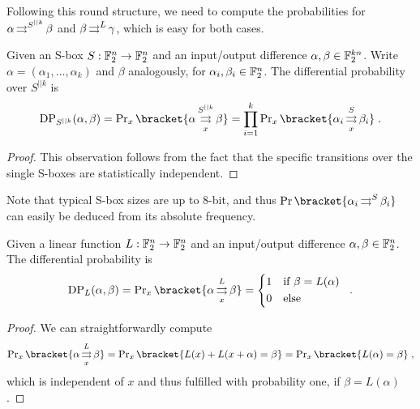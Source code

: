 Following this round structure, we need to compute the probabilities for $\alpha \operatorname*{\rightrightarrows}^{S^{||k}}_{} \beta$ and $\beta \operatorname*{\rightrightarrows}^{L}_{} \gamma$, which is easy for both cases.
\begin{lemma}\label{lem:dp-sbox}
    Given an S-box $S : \mathbb{F}_2^{n} \to \mathbb{F}_2^{n}$ and an input/output difference $\alpha, \beta \in \mathbb{F}_2^{kn}$.
    Write $\alpha = (\alpha_1, \ldots, \alpha_k)$ and $\beta$ analogously, for $\alpha_i, \beta_i \in \mathbb{F}_2^n$.
    The differential probability over $S^{||k}$ is
    \begin{equation*}
        \mathrm{DP}_{S^{||k}}(\alpha, \beta) = \Prob_x\bracket{\propDiff{\alpha}{S^{||k}}{x}{\beta}} = \prod_{i=1}^k \Prob_x\bracket{\propDiff{\alpha_i}{S}{x}{\beta_i}}\;.
    \end{equation*}
\end{lemma}
\begin{proof}
    This observation follows from the fact that the specific transitions over the single S-boxes are statistically independent.
\end{proof}
Note that typical S-box sizes are up to $8$-bit, and thus $\Prob\bracket{\propDiff{\alpha_i}{S}{}{\beta_i}}$ can easily be deduced from its absolute frequency.
\begin{lemma}\label{lem:dp-llayer}
    Given a linear function $L : \mathbb{F}_2^{n} \to \mathbb{F}_2^{n}$ and an input/output difference $\alpha, \beta \in \mathbb{F}_2^n$.
    The differential probability is
    \begin{equation*}
        \mathrm{DP}_L(\alpha, \beta) = \Prob_x\bracket{\propDiff{\alpha}{L}{x}{\beta}} = \begin{cases*}
            1 & if $\beta = L(\alpha)$ \\
            0 & else
        \end{cases*}\;.
    \end{equation*}
\end{lemma}
\begin{proof}
    We can straightforwardly compute
    \begin{equation*}
        \Prob_x\bracket{\propDiff{\alpha}{L}{x}{\beta}} = \Prob_x\bracket{L(x) + L(x+\alpha) = \beta} = \Prob_x\bracket{L(\alpha) = \beta}\;,
    \end{equation*}
    which is independent of $x$ and thus fulfilled with probability one, if $\beta = L(\alpha)$.
\end{proof}

